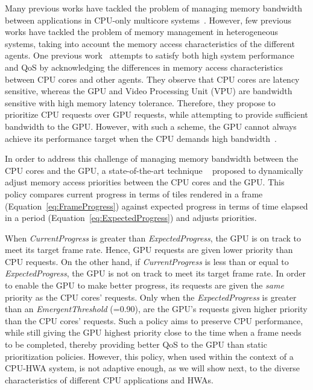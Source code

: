 \documentclass[10pt,letterpaper]{article}
\newcommand{\TMP}[1]{#1}
\begin{document}
Many previous works have tackled the problem of managing memory
bandwidth between applications in CPU-only multicore
systems~\cite{frfcfs,stfm,parbs,fqm,atlas,tcm,mise}. However, few previous works
have tackled the problem of memory management in heterogeneous systems, taking
into account the memory access characteristics of the different agents. One
previous work~\cite{armwhite} attempts to satisfy both high system performance
and QoS by acknowledging the differences in memory access characteristics
between CPU cores and other agents. They observe that CPU cores are latency
\TMP{sensitive, whereas the GPU and Video Processing Unit (VPU) are bandwidth
sensitive with high memory latency tolerance. Therefore, they propose to
prioritize CPU requests over GPU requests, while attempting to provide sufficient bandwidth to the GPU. }
However, with such a scheme, the GPU cannot
always achieve its performance target when the CPU demands high
bandwidth~\cite{schedulingCPUGPU}. 



In order to address this challenge of managing memory bandwidth
between the CPU cores and the GPU, a state-of-the-art technique
~\cite{schedulingCPUGPU} proposed to dynamically adjust memory
access priorities between the CPU cores and the GPU. This policy
compares current progress in terms of tiles rendered in a
frame (Equation~\ref{eq:FrameProgress}) against expected progress
in terms of time elapsed in a period
(Equation~\ref{eq:ExpectedProgress}) and adjusts priorities.

\begin{small}
  
  
\end{small}

When {\it CurrentProgress} is greater than {\it ExpectedProgress}, the GPU is on
track to meet its target frame rate. Hence, GPU requests are given lower priority than
CPU requests. On the other hand, if {\it CurrentProgress} is less than or equal to
{\it ExpectedProgress}, the GPU is not on track to meet its target frame rate.
\TMP{In order to enable the GPU to make better progress, its requests are given the
{\it same} priority as the CPU cores' requests. Only when the {\it
ExpectedProgress} is greater than an {\it EmergentThreshold} (=0.90), are the GPU's
requests given higher priority than the CPU cores' requests.}
Such a policy
aims to preserve CPU performance, while still giving the GPU highest priority
\TMP{close to the time when a frame needs to be completed,}
thereby providing better
QoS to the GPU than static prioritization policies. However, this policy, when
used within the context of a CPU-HWA system, is not adaptive enough, as we will
show next, to the diverse characteristics of different CPU applications and
HWAs.
\end{document}

